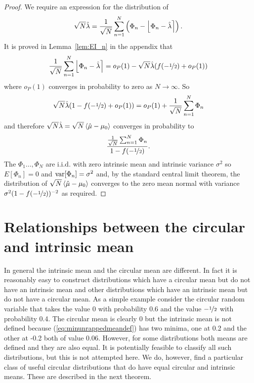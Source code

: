 \documentclass[journal]{IEEEtran}
\begin{document}
\begin{proof}
We require an expression for the distribution of
\[
\sqrt{N}\hat{\lambda} = \frac{1}{\sqrt{N}}\sum_{n=1}^{N} \left( \Phi_n - {\left\lfloor  \Phi_n - \hat{\lambda}  \right\rceil}\right).
\]
It is proved in Lemma~\ref{lem:EI_n} in the appendix that
\[
\frac{1}{\sqrt{N}}\sum_{n=1}^{N} {\left\lfloor  \Phi_n - \hat{\lambda} \right\rceil} = o_P(1)  - \sqrt{N} \hat{\lambda}( f(-\nicefrac{1}{2}) + o_P(1) )
\]
where $o_P(1)$ converges in probability to zero as $N\rightarrow\infty$.  So
\[
\sqrt{N}\hat{\lambda}(1 - f(-\nicefrac{1}{2}) + o_P(1) ) = o_P(1) + \frac{1}{\sqrt{N}}\sum_{n=1}^{N} \Phi_n
\]
and therefore $\sqrt{N}\hat{\lambda} = \sqrt{N}\left< \hat{\mu} - \mu_0 \right>$ converges in probability to
\[
\frac{\frac{1}{\sqrt{N}}\sum_{n=1}^{N} \Phi_n}{1 - f(-\nicefrac{1}{2})}.
\]
The $\Phi_1\dots,\Phi_N$ are i.i.d. with zero intrinsic mean and intrinsic variance $\sigma^2$ so $E[\Phi_n] = 0$ and $\operatorname{var}[\Phi_n] = \sigma^2$ and, by the standard central limit theorem, the distribution of $\sqrt{N}\left< \hat{\mu} - \mu_0 \right>$ converges to the zero mean normal with variance $\sigma^2(1 - f(-\nicefrac{1}{2}))^{-2}$ as required. 
\end{proof}



\section{Relationships between the circular and intrinsic mean}\label{sec:relationships_circ_intrinsic_mean}

In general the intrinsic mean and the circular mean are different. In fact it is reasonably easy to construct distributions which have a circular mean but do not have an intrinsic mean and other distributions which have an intrinsic mean but do not have a circular mean. As a simple example consider the circular random variable that takes the value 0 with probability 0.6 and the value $-\nicefrac{1}{2}$ with probability 0.4.  The circular mean is clearly 0 but the intrinsic mean is not defined because (\ref{eq:minunrappedmeandef}) has two minima, one at 0.2 and the other at -0.2 both of value 0.06.  However, for some distributions both means are defined and they are also equal. It is potentially feasible to classify all such distributions, but this is not attempted here.  We do, however, find a particular class of useful circular distributions that do have equal circular and intrinsic means. These are described in the next theorem.
\end{document}
